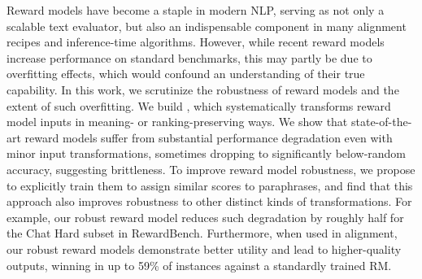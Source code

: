 Reward models have become a staple in modern NLP, serving as not only a scalable text evaluator, but also an indispensable component in many alignment recipes and inference-time algorithms.
However, while recent reward models increase performance on standard benchmarks, this may partly be due to overfitting effects, which would confound an understanding of their true capability.
In this work, we scrutinize the robustness of reward models and the extent of such overfitting.
We build \textbf{\benchmark}, which systematically transforms reward model inputs in meaning- or ranking-preserving ways.
We show that state-of-the-art reward models suffer from substantial performance degradation even with minor input transformations, sometimes dropping to significantly below-random accuracy, suggesting brittleness.
To improve reward model robustness, we propose to explicitly train them to assign similar scores to paraphrases, and find that this approach also improves robustness to other distinct kinds of transformations.
For example, our robust reward model reduces such degradation by roughly half for the Chat Hard subset in RewardBench.
Furthermore, when used in alignment, our robust reward models demonstrate better utility and lead to higher-quality outputs, winning in up to 59\% of instances against a standardly trained RM.
